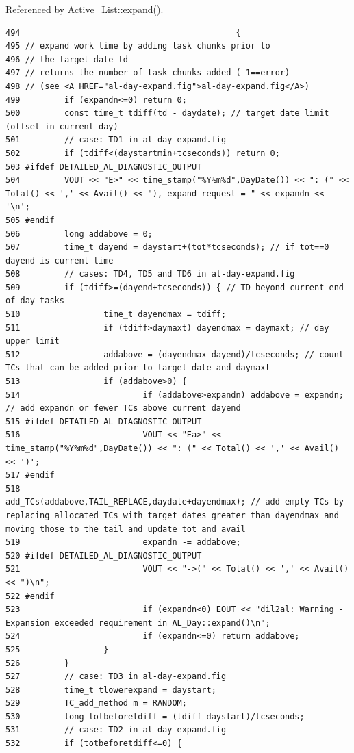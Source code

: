 Referenced by Active\_\-List::expand().



\footnotesize\begin{verbatim}494                                            {
495 // expand work time by adding task chunks prior to
496 // the target date td
497 // returns the number of task chunks added (-1==error)
498 // (see <A HREF="al-day-expand.fig">al-day-expand.fig</A>)
499         if (expandn<=0) return 0;
500         const time_t tdiff(td - daydate); // target date limit (offset in current day)
501         // case: TD1 in al-day-expand.fig
502         if (tdiff<(daystartmin+tcseconds)) return 0;
503 #ifdef DETAILED_AL_DIAGNOSTIC_OUTPUT
504         VOUT << "E>" << time_stamp("%Y%m%d",DayDate()) << ": (" << Total() << ',' << Avail() << "), expand request = " << expandn << '\n';
505 #endif
506         long addabove = 0;
507         time_t dayend = daystart+(tot*tcseconds); // if tot==0 dayend is current time
508         // cases: TD4, TD5 and TD6 in al-day-expand.fig
509         if (tdiff>=(dayend+tcseconds)) { // TD beyond current end of day tasks
510                 time_t dayendmax = tdiff;
511                 if (tdiff>daymaxt) dayendmax = daymaxt; // day upper limit
512                 addabove = (dayendmax-dayend)/tcseconds; // count TCs that can be added prior to target date and daymaxt
513                 if (addabove>0) {
514                         if (addabove>expandn) addabove = expandn; // add expandn or fewer TCs above current dayend
515 #ifdef DETAILED_AL_DIAGNOSTIC_OUTPUT
516                         VOUT << "Ea>" << time_stamp("%Y%m%d",DayDate()) << ": (" << Total() << ',' << Avail() << ')';
517 #endif
518                         add_TCs(addabove,TAIL_REPLACE,daydate+dayendmax); // add empty TCs by replacing allocated TCs with target dates greater than dayendmax and moving those to the tail and update tot and avail
519                         expandn -= addabove;
520 #ifdef DETAILED_AL_DIAGNOSTIC_OUTPUT
521                         VOUT << "->(" << Total() << ',' << Avail() << ")\n";
522 #endif
523                         if (expandn<0) EOUT << "dil2al: Warning - Expansion exceeded requirement in AL_Day::expand()\n";
524                         if (expandn<=0) return addabove;
525                 }
526         }
527         // case: TD3 in al-day-expand.fig
528         time_t tlowerexpand = daystart;
529         TC_add_method m = RANDOM;
530         long totbeforetdiff = (tdiff-daystart)/tcseconds;
531         // case: TD2 in al-day-expand.fig
532         if (totbeforetdiff<=0) {

\end{verbatim}
